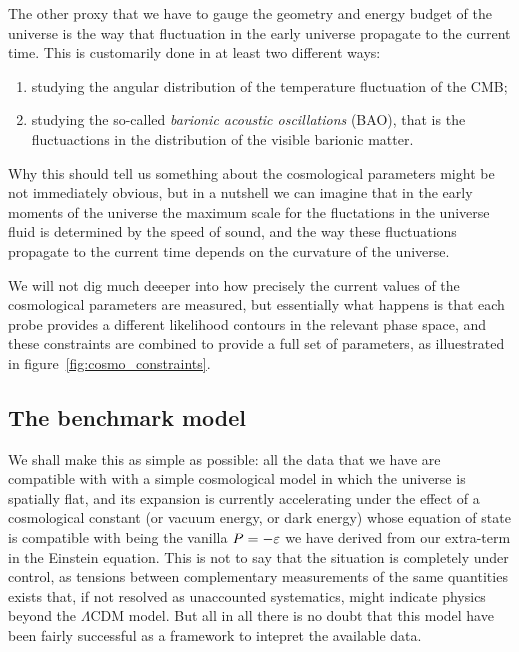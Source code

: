 The other proxy that we have to gauge the geometry and energy budget of the universe
is the way that fluctuation in the early universe propagate to the current time.
This is customarily done in at least two different ways:
\begin{enumerate}
  \item studying the angular distribution of the temperature fluctuation of the
  CMB;
  \item studying the so-called \emph{barionic acoustic oscillations} (BAO), that is
  the fluctuactions in the distribution of the visible barionic matter.
\end{enumerate}
Why this should tell us something about the cosmological parameters might be not
immediately obvious, but in a nutshell we can imagine that in the early moments of the
universe the maximum scale for the fluctations in the universe fluid is determined
by the speed of sound, and the way these fluctuations propagate to the current time
depends on the curvature of the universe.

We will not dig much deeeper into how precisely the current values of the cosmological
parameters are measured, but essentially what happens is that each probe provides
a different likelihood contours  in the relevant phase space, and these constraints
are combined to provide a full set of parameters, as illuestrated in
figure~\ref{fig:cosmo_constraints}.



\subsection{The benchmark model}

We shall make this as simple as possible: all the data that we have are compatible
with with a simple cosmological model in which the universe is spatially flat, and
its expansion is currently accelerating under the effect of a cosmological constant
(or vacuum energy, or dark energy) whose equation of state is compatible with being
the vanilla $P = -\varepsilon$ we have derived from our extra-term in the
Einstein equation. This is not to say that the situation is completely under control,
as tensions between complementary measurements of the same quantities exists that,
if not resolved as unaccounted systematics, might indicate physics beyond the $\Lambda$CDM
model. But all in all there is no doubt that this model have been fairly successful
as a framework to intepret the available data.

